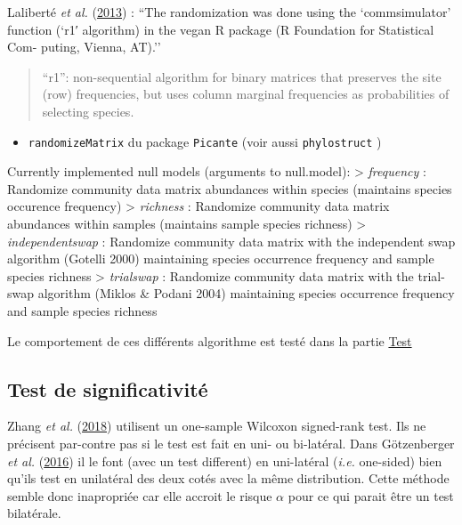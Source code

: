 \documentclass[]{article}
\providecommand{\tightlist}{%
  \setlength{\itemsep}{0pt}\setlength{\parskip}{0pt}}
\begin{document}
Laliberté \emph{et al.} (\protect\hyperlink{ref-laliberte2013}{2013}) :
``The randomization was done using the `commsimulator' function (`r1′
algorithm) in the vegan R package (R Foundation for Statistical Com-
puting, Vienna, AT).''

\begin{quote}
``r1'': non-sequential algorithm for binary matrices that preserves the
site (row) frequencies, but uses column marginal frequencies as
probabilities of selecting species.
\end{quote}

\begin{itemize}
\tightlist
\item
  \texttt{randomizeMatrix} du package \texttt{Picante} (voir aussi
  \texttt{phylostruct} )
\end{itemize}

Currently implemented null models (arguments to null.model):
\textgreater{} \emph{frequency} : Randomize community data matrix
abundances within species (maintains species occurence frequency)
\textgreater{} \emph{richness} : Randomize community data matrix
abundances within samples (maintains sample species richness)
\textgreater{} \emph{independentswap} : Randomize community data matrix
with the independent swap algorithm (Gotelli 2000) maintaining species
occurrence frequency and sample species richness \textgreater{}
\emph{trialswap} : Randomize community data matrix with the trial-swap
algorithm (Miklos \& Podani 2004) maintaining species occurrence
frequency and sample species richness

Le comportement de ces différents algorithme est testé dans la partie
\protect\hyperlink{test}{Test}

\subsection{Test de significativité}\label{test-de-significativite}

Zhang \emph{et al.} (\protect\hyperlink{ref-zhang2018}{2018}) utilisent
un one-sample Wilcoxon signed-rank test. Ils ne précisent par-contre pas
si le test est fait en uni- ou bi-latéral. Dans Götzenberger \emph{et
al.} (\protect\hyperlink{ref-gotzenberger2016randomizations}{2016}) il
le font (avec un test different) en uni-latéral (\emph{i.e.} one-sided)
bien qu'ils test en unilatéral des deux cotés avec la même distribution.
Cette méthode semble donc inapropriée car elle accroit le risque
\(\alpha\) pour ce qui parait être un test bilatérale.
\end{document}
